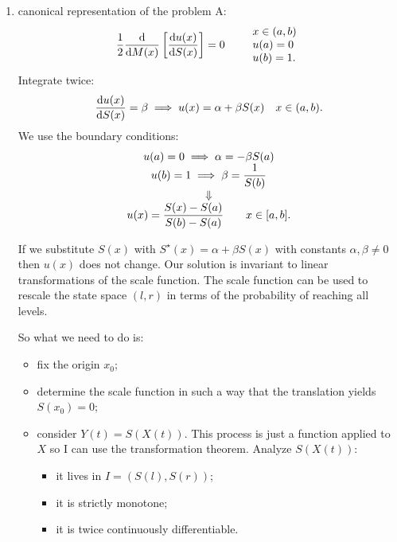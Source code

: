 \documentclass[12pt]{report}
\begin{document}
\begin{enumerate}[\bfseries A:]
	\item canonical representation of the problem A:
	\begin{equation*}
		\frac{1}{2}\frac{\mathop{}\!\mathrm{d}}{\mathop{}\!\mathrm{d} M(x)}\left[\frac{\mathop{}\!\mathrm{d} u(x)}{\mathop{}\!\mathrm{d} S(x)}\right]=0\qquad\begin{array}{l}
			x\in(a,b)\\
			u(a)=0\\
			u(b)=1.
		\end{array}
	\end{equation*}
	Integrate twice:
	\begin{equation*}
		\frac{\mathop{}\!\mathrm{d} u(x)}{\mathop{}\!\mathrm{d} S(x)}=\beta\implies u(x)=\alpha+\beta S(x)\quad x\in(a,b).
	\end{equation*}
	We use the boundary conditions:
	\begin{equation*}
		\begin{array}{>{\displaystyle}c}
			u(a)=0\implies \alpha=-\beta S(a)\\
			u(b)=1\implies \beta=\frac{1}{S(b)}\\
			\Downarrow\\
			u(x)=\frac{S(x)-S(a)}{S(b)-S(a)}\qquad x\in[a,b].
		\end{array}
	\end{equation*}
	\begin{remark}
		If we substitute $S(x)$ with $S^{\star}(x)=\alpha+\beta S(x)$ with constants $\alpha,\beta\neq0$ then $u(x)$ does not change. Our solution is invariant to linear transformations of the scale function. The scale function can be used to rescale the state space $(l,r)$ in terms of the probability of reaching all levels.
	\end{remark}
	So what we need to do is:
	\begin{itemize}
		\item fix the origin $x_{0}$;
		\item determine the scale function in such a way that the translation yields $S(x_{0})=0$;
		\item consider $Y(t)=S(X(t))$. This process is just a function applied to $X$ so I can use the transformation theorem. Analyze $S(X(t))$:
		\begin{itemize}
			\item it lives in $I=(S(l), S(r))$;
			\item it is strictly monotone;
			\item it is twice continuously differentiable.
		\end{itemize}

\end{itemize}
\end{enumerate}
\end{document}
